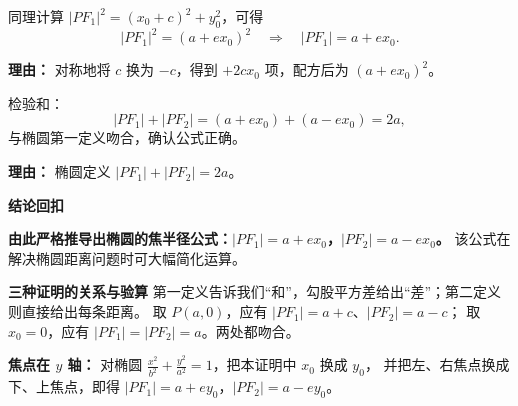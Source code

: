 \begin{proofbox}
\begin{description}[style=nextline, leftmargin=2.8em, labelsep=0.5em, itemsep=0.55em]
		\item[\textbf{步骤五（对称类推）：}] 同理计算 $|PF_1|^2 = (x_0 + c)^2 + y_0^2$，可得
			\[
				|PF_1|^2 = (a + e x_0)^2 \quad\Rightarrow\quad |PF_1| = a + e x_0.
			\]
			\par\textbf{理由：} 对称地将 $c$ 换为 $-c$，得到 $+2c x_0$ 项，配方后为 $(a + e x_0)^2$。

		\item[\textbf{步骤六（验证定义）：}] 检验和：
			\[
				|PF_1| + |PF_2| = (a + e x_0) + (a - e x_0) = 2a,
			\]
			与椭圆第一定义吻合，确认公式正确。
			\par\textbf{理由：} 椭圆定义 $|PF_1|+|PF_2|=2a$。
	\end{description}

	\medskip
	\textbf{\textcolor{CProof}{结论回扣}}

	\textbf{由此严格推导出椭圆的焦半径公式：$|PF_1| = a + e x_0$，$|PF_2| = a - e x_0$。} 该公式在解决椭圆距离问题时可大幅简化运算。

\medskip
\textbf{\textcolor{CProof}{三种证明的关系与验算}}
第一定义告诉我们“和”，勾股平方差给出“差”；第二定义则直接给出每条距离。
取 $P(a,0)$，应有 $|PF_1|=a+c$、$|PF_2|=a-c$；
取 $x_0=0$，应有 $|PF_1|=|PF_2|=a$。两处都吻合。

\textbf{焦点在 $y$ 轴：} 对椭圆
$\frac{x^2}{b^2}+\frac{y^2}{a^2}=1$，把本证明中 $x_0$ 换成 $y_0$，
并把左、右焦点换成下、上焦点，即得
$|PF_1|=a+ey_0$，$|PF_2|=a-ey_0$。
\end{proofbox}
